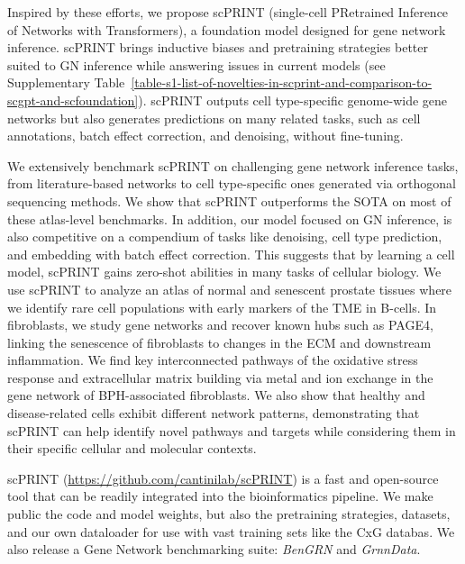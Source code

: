 Inspired by these efforts, we propose \gls{scPRINT} (single-cell PRetrained Inference of Networks with Transformers), a foundation model designed for gene network inference. \gls{scPRINT} brings inductive biases and pretraining strategies better suited to \gls{GN} inference while answering issues in current models (see Supplementary Table~\ref{table-s1-list-of-novelties-in-scprint-and-comparison-to-scgpt-and-scfoundation}). \gls{scPRINT} outputs cell type-specific genome-wide gene networks but also generates predictions on many related tasks, such as cell annotations, batch effect correction, and denoising, without fine-tuning.

We extensively benchmark \gls{scPRINT} on challenging gene network inference tasks, from literature-based networks to cell type-specific ones generated via orthogonal sequencing methods. We show that \gls{scPRINT} outperforms the \gls{SOTA} on most of these atlas-level benchmarks. In addition, our model focused on \gls{GN} inference, is also competitive on a compendium of tasks like denoising, cell type prediction, and embedding with batch effect correction. This suggests that by learning a cell model, \gls{scPRINT} gains zero-shot abilities in many tasks of cellular biology. 
We use \gls{scPRINT} to analyze an atlas of normal and senescent prostate tissues where we identify rare cell populations with early markers of the \gls{TME} in B-cells. In fibroblasts, we study gene networks and recover known hubs such as PAGE4, linking the senescence of fibroblasts to changes in the \gls{ECM} and downstream inflammation. We find key interconnected pathways of the oxidative stress response and extracellular matrix building via metal and ion exchange in the gene network of \gls{BPH}-associated fibroblasts. We also show that healthy and disease-related cells exhibit different network patterns, demonstrating that \gls{scPRINT} can help identify novel pathways and targets while considering them in their specific cellular and molecular contexts.

\gls{scPRINT}\citep{kalfonCantinilabScPRINT2025} (\url{https://github.com/cantinilab/scPRINT}) is a fast and open-source tool that can be readily integrated into the bioinformatics pipeline. We make public the code and model weights, but also the pretraining strategies, datasets, and our own dataloader for use with vast training sets like the \gls{CxG} databas\citep{programCZCELLxGENEDiscover2023}. We also release a Gene Network benchmarking suite: \emph{BenGRN}\citep{kalfonJkobjectBenGRNAwesome2025} and \emph{GrnnData}\citep{kalfonCantinilabGRnnData2025}. 

